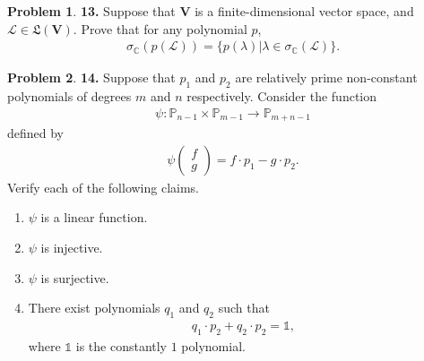\documentclass{article}
\theoremstyle{definition}
\newtheorem*{prob*}{Problem}
\newcommand{\V}{\mathbf{V}}
\newcommand{\lag}{\mathcal{L}}
\newcommand{\poly}{\mathbb{P}}
\newcommand{\LL}{\mathfrak{L}}
\begin{document}
\newpage



\begin{prob*}\textbf{13.} Suppose that $\V$ is a finite-dimensional vector space, and $\lag \in \LL(\V)$. Prove that for any polynomial $p$,
	\begin{align*}
	\sigma_\mathbb{C}(p(\lag)) = \{ p(\lambda) \vert \lambda \in \sigma_\mathbb{C}(\lag) \}.
	\end{align*}
	
\end{prob*}




























\newpage



\begin{prob*}\textbf{14.} Suppose that $p_1$ and $p_2$ are relatively prime non-constant polynomials of degrees $m$ and $n$ respectively. Consider the function 
	\begin{align*}
	\psi : \poly_{n-1} \times \poly_{m-1} \to \poly_{m+n-1}
	\end{align*}
	defined by
	\begin{align*}
	\psi\begin{pmatrix}
	f\\g
	\end{pmatrix} = f\cdot p_1 - g\cdot p_2.
	\end{align*}
	Verify each of the following claims.
	\begin{enumerate}
		\item $\psi$ is a linear function.
		\item $\psi$ is injective.
		\item $\psi$ is surjective.
		\item There exist polynomials $q_1$ and $q_2$ such that
		\begin{align*}
		q_1 \cdot p_2 + q_2 \cdot p_2 = \mathbb{1},
		\end{align*}
		where $\mathbb{1}$ is the constantly $1$ polynomial.
	\end{enumerate}
	
\end{prob*}
\end{document}
